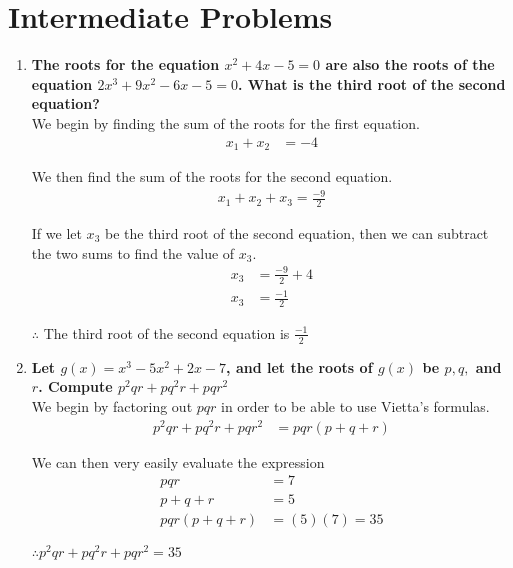\documentclass[12pt]{article}
\begin{document}
\section*{Intermediate Problems}
\begin{enumerate}
    \item \textbf{The roots for the equation $x^2 + 4x - 5 = 0$ are also the roots of the equation $2x^3 + 9x^2 - 6x - 5 = 0$. What is the third root of the second equation?} \\
    
    We begin by finding the sum of the roots for the first equation.
    \begin{align*}
        x_1+x_2&=-4
    \end{align*}
    
    We then find the sum of the roots for the second equation.
    \begin{align*}
        x_1+x_2+x_3=\frac{-9}{2}
    \end{align*}
    
    If we let $x_3$ be the third root of the second equation, then we can subtract the two sums to find the value of $x_3$.
    \begin{align*}
        x_3&=\frac{-9}{2}+4 \\
        x_3&=\frac{-1}{2}
    \end{align*}
    
    $\therefore$ The third root of the second equation is $\frac{-1}{2}$
    
    \item \textbf{Let $g(x) = x^3 - 5x^2 + 2x - 7$, and let the roots of $g(x)$ be $p, q,$ and $r$. Compute $p^2qr + pq^2r + pqr^2$} \\
    
    We begin by factoring out $pqr$ in order to be able to use Vietta's formulas.
    \begin{align*}
        p^2qr+pq^2r+pqr^2&=pqr(p+q+r)
    \end{align*}
    
    We can then very easily evaluate the expression
    \begin{align*}
        pqr&=7 \\
        p+q+r&=5 \\
        pqr(p+q+r)&=(5)(7)=35
    \end{align*}
    
    $\therefore p^2qr+pq^2r+pqr^2=35$
    
\end{enumerate}
\newpage
\end{document}
